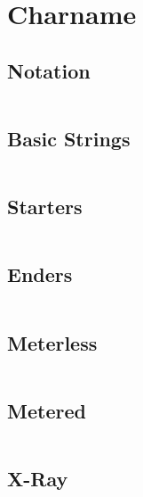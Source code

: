 \documentclass[main.tex]{subfiles}
\begin{document}
\chapter{Charname}

\section{Notation}
\begin{lstlisting}[language=FG]
\end{lstlisting}


\section{Basic Strings}

\begin{lstlisting}[language=FG]
\end{lstlisting}

\section{Starters}
\begin{lstlisting}[language=FG]

\end{lstlisting}

\section{Enders}

\begin{lstlisting}[language=FG]
\end{lstlisting}

\section{Meterless}


\begin{lstlisting}[language=FG]

\end{lstlisting}

\section{Metered}


\begin{lstlisting}[language=FG]
\end{lstlisting}

\section{X-Ray}
\begin{lstlisting}[language=FG]

\end{lstlisting}
\end{document}

